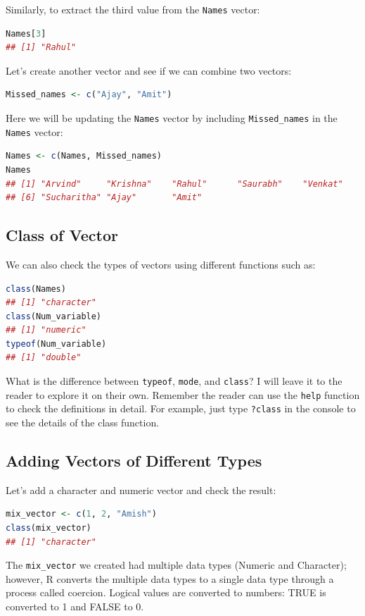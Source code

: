 \documentclass[10pt]{book}
\begin{document}
Similarly, to extract the third value from the \texttt{Names} vector:
\begin{lstlisting}[language=R]
Names[3]
## [1] "Rahul"
\end{lstlisting}

Let’s create another vector and see if we can combine two vectors:
\begin{lstlisting}[language=R]
Missed_names <- c("Ajay", "Amit")
\end{lstlisting}

Here we will be updating the \texttt{Names} vector by including \texttt{Missed\_names} in the \texttt{Names} vector:
\begin{lstlisting}[language=R]
Names <- c(Names, Missed_names)
Names
## [1] "Arvind"     "Krishna"    "Rahul"      "Saurabh"    "Venkat"    
## [6] "Sucharitha" "Ajay"       "Amit"
\end{lstlisting}

\subsection{Class of Vector}
We can also check the types of vectors using different functions such as:
\begin{lstlisting}[language=R]
class(Names)
## [1] "character"
class(Num_variable)
## [1] "numeric"
typeof(Num_variable)
## [1] "double"
\end{lstlisting}

What is the difference between \texttt{typeof}, \texttt{mode}, and \texttt{class}? I will leave it to the reader to explore it on their own. Remember the reader can use the \texttt{help} function to check the definitions in detail. For example, just type \texttt{?class} in the console to see the details of the class function.

\subsection{Adding Vectors of Different Types}
Let’s add a character and numeric vector and check the result:
\begin{lstlisting}[language=R]
mix_vector <- c(1, 2, "Amish")
class(mix_vector)
## [1] "character"
\end{lstlisting}

The \texttt{mix\_vector} we created had multiple data types (Numeric and Character); however, R converts the multiple data types to a single data type through a process called coercion. Logical values are converted to numbers: TRUE is converted to 1 and FALSE to 0.
\end{document}
